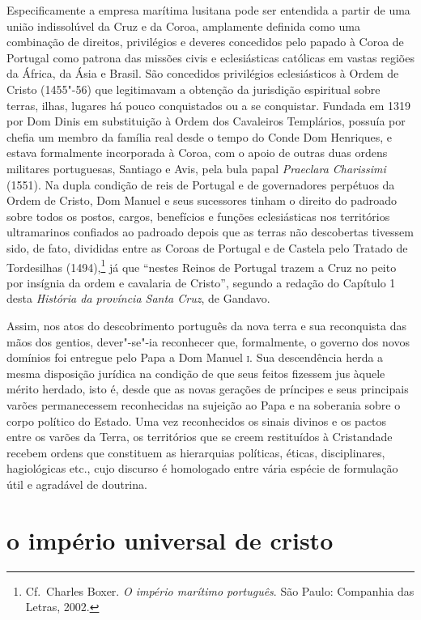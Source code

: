 Especificamente a empresa marítima lusitana pode ser entendida a partir
de uma união indissolúvel da Cruz e da Coroa, amplamente definida como
uma combinação de direitos, privilégios e deveres concedidos pelo
papado à Coroa de Portugal como patrona das missões civis e
eclesiásticas católicas em vastas regiões da África, da Ásia e Brasil.
São concedidos privilégios eclesiásticos à Ordem de Cristo (1455"-56)
que legitimavam a obtenção da jurisdição espiritual sobre terras,
ilhas, lugares há pouco conquistados ou a se conquistar. Fundada em
1319 por Dom Dinis em substituição à Ordem dos Cavaleiros Templários,
possuía por chefia um membro da família real desde o tempo do Conde Dom
Henriques, e estava formalmente incorporada à Coroa, com o apoio de
outras duas ordens militares portuguesas, Santiago e Avis, pela bula
papal \textit{Praeclara Charissimi} (1551). Na dupla condição de reis de
Portugal e de governadores perpétuos da Ordem de Cristo, Dom Manuel e
seus sucessores tinham o direito do padroado sobre todos os postos,
cargos, benefícios e funções eclesiásticas nos territórios ultramarinos
confiados ao padroado depois que as terras não descobertas tivessem
sido, de fato, divididas entre as Coroas de Portugal e de Castela pelo
Tratado de Tordesilhas (1494),\footnote{ Cf.~Charles Boxer. \textit{O império
marítimo português}. São Paulo: Companhia das Letras, 2002.} já que
``nestes Reinos de Portugal trazem a Cruz no peito por
insígnia da ordem e cavalaria de Cristo'', segundo a
redação do Capítulo 1 desta \textit{História da província Santa Cruz}, de Gandavo.

Assim, nos atos do descobrimento português da nova terra e sua
reconquista das mãos dos gentios, dever"-se"-ia reconhecer que,
formalmente, o governo dos novos domínios foi entregue pelo Papa a Dom
Manuel \textsc{i}. Sua descendência herda a mesma disposição jurídica na
condição de que seus feitos fizessem jus àquele mérito herdado, isto é,
desde que as novas gerações de príncipes e seus principais varões
permanecessem reconhecidas na sujeição ao Papa e na soberania sobre o
corpo político do Estado. Uma vez reconhecidos os sinais divinos e os
pactos entre os varões da Terra, os territórios que se creem
restituídos à Cristandade recebem ordens que constituem as hierarquias
políticas, éticas, disciplinares, hagiológicas etc., cujo discurso é
homologado entre vária espécie de formulação útil e agradável de doutrina. 

\section{o império universal de cristo}

